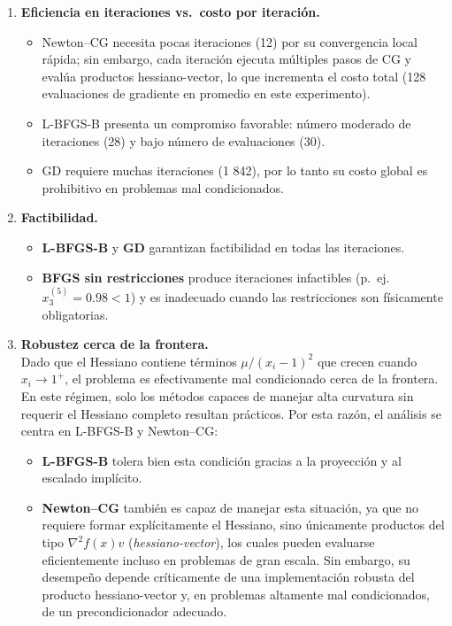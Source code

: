 \documentclass[
  spanish,
  us-letterpaper,
]{scrreprt}
\providecommand{\tightlist}{%
  \setlength{\itemsep}{0pt}\setlength{\parskip}{0pt}}
\numberwithin{equation}{section}
\begin{document}
\begin{enumerate}
\def\labelenumi{\arabic{enumi}.}
\item
  \textbf{Eficiencia en iteraciones vs.~costo por iteración.}

  \begin{itemize}
  \tightlist
  \item
    Newton--CG necesita pocas iteraciones (12) por su convergencia local
    rápida; sin embargo, cada iteración ejecuta múltiples pasos de CG y
    evalúa productos hessiano-vector, lo que incrementa el costo total
    (128 evaluaciones de gradiente en promedio en este experimento).\\
  \item
    L-BFGS-B presenta un compromiso favorable: número moderado de
    iteraciones (28) y bajo número de evaluaciones (30).
  \item
    GD requiere muchas iteraciones (1 842), por lo tanto su costo global
    es prohibitivo en problemas mal condicionados.
  \end{itemize}
\item
  \textbf{Factibilidad.}

  \begin{itemize}
  \tightlist
  \item
    \textbf{L-BFGS-B} y \textbf{GD} garantizan factibilidad en todas las
    iteraciones.\\
  \item
    \textbf{BFGS sin restricciones} produce iteraciones infactibles
    (p.~ej. \(x_3^{(5)} = 0.98 < 1\)) y es inadecuado cuando las
    restricciones son físicamente obligatorias.
  \end{itemize}
\item
  \textbf{Robustez cerca de la frontera.}\\
  Dado que el Hessiano contiene términos \(\mu/(x_i-1)^2\) que crecen
  cuando \(x_i\to 1^+\), el problema es efectivamente mal condicionado
  cerca de la frontera. En este régimen, solo los métodos capaces de
  manejar alta curvatura sin requerir el Hessiano completo resultan
  prácticos. Por esta razón, el análisis se centra en L-BFGS-B y
  Newton--CG:

  \begin{itemize}
  \tightlist
  \item
    \textbf{L-BFGS-B} tolera bien esta condición gracias a la proyección
    y al escalado implícito.\\
  \item
    \textbf{Newton--CG} también es capaz de manejar esta situación, ya
    que no requiere formar explícitamente el Hessiano, sino únicamente
    productos del tipo \(\nabla^2 f(x) v\) (\emph{hessiano-vector}), los
    cuales pueden evaluarse eficientemente incluso en problemas de gran
    escala. Sin embargo, su desempeño depende críticamente de una
    implementación robusta del producto hessiano-vector y, en problemas
    altamente mal condicionados, de un precondicionador adecuado.
  \end{itemize}


\end{enumerate}
\end{document}
